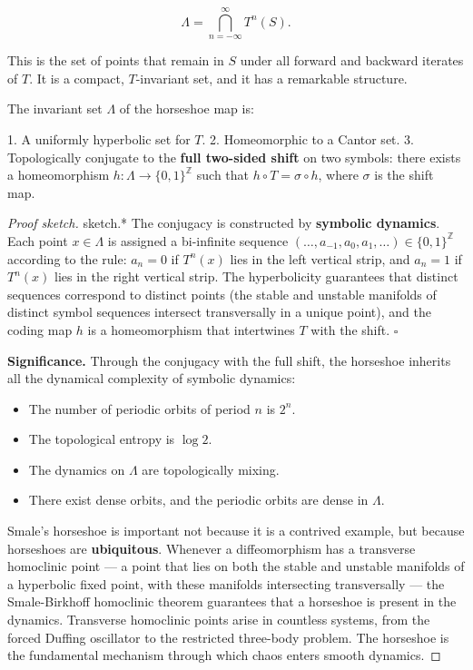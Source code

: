 \[
\Lambda = \bigcap_{n=-\infty}^{\infty} T^n(S).
\]

This is the set of points that remain in $S$ under all forward and backward iterates of $T$. It is a compact, $T$-invariant set, and it has a remarkable structure.

\begin{theorem}[Smale]\label{thm:12.4}
The invariant set $\Lambda$ of the horseshoe map is:

1. A uniformly hyperbolic set for $T$.
2. Homeomorphic to a Cantor set.
3. Topologically conjugate to the \textbf{full two-sided shift} on two symbols: there exists a homeomorphism $h: \Lambda \to \{0, 1\}^\mathbb{Z}$ such that $h \circ T = \sigma \circ h$, where $\sigma$ is the shift map.
\end{theorem}


\begin{proof}[Proof sketch]
sketch.* The conjugacy is constructed by \textbf{symbolic dynamics}. Each point $x \in \Lambda$ is assigned a bi-infinite sequence $(\ldots, a_{-1}, a_0, a_1, \ldots) \in \{0, 1\}^\mathbb{Z}$ according to the rule: $a_n = 0$ if $T^n(x)$ lies in the left vertical strip, and $a_n = 1$ if $T^n(x)$ lies in the right vertical strip. The hyperbolicity guarantees that distinct sequences correspond to distinct points (the stable and unstable manifolds of distinct symbol sequences intersect transversally in a unique point), and the coding map $h$ is a homeomorphism that intertwines $T$ with the shift. $\square$

\textbf{Significance.} Through the conjugacy with the full shift, the horseshoe inherits all the dynamical complexity of symbolic dynamics:

\begin{itemize}[nosep]
  \item The number of periodic orbits of period $n$ is $2^n$.
  \item The topological entropy is $\log 2$.
  \item The dynamics on $\Lambda$ are topologically mixing.
  \item There exist dense orbits, and the periodic orbits are dense in $\Lambda$.
\end{itemize}

Smale's horseshoe is important not because it is a contrived example, but because horseshoes are \textbf{ubiquitous}. Whenever a diffeomorphism has a transverse homoclinic point --- a point that lies on both the stable and unstable manifolds of a hyperbolic fixed point, with these manifolds intersecting transversally --- the Smale-Birkhoff homoclinic theorem guarantees that a horseshoe is present in the dynamics. Transverse homoclinic points arise in countless systems, from the forced Duffing oscillator to the restricted three-body problem. The horseshoe is the fundamental mechanism through which chaos enters smooth dynamics.


\end{proof}

